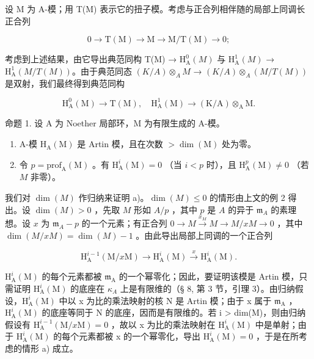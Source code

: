 设 M 为 A-模；用 T(M) 表示它的扭子模。考虑与正合列相伴随的局部上同调长正合列

\[
0 \to \mathrm{T} (\mathrm{M}) \to \mathrm{M} \to \mathrm{M} / \mathrm{T} (\mathrm{M}) \to 0;
\]

考虑到上述结果，由它导出典范同构 T(M) → \(\mathrm{H}_{\mathrm{A}}^{0}(M)\) 与 \(\mathrm{H}_{\mathrm{A}}^{1}(M)\) → \(\mathrm{H}_{\mathrm{A}}^{1}(M/T(M))\)。由于典范同态 \((K/A) \otimes_{A} M\) → \((K/A) \otimes_{A} (M/T(M))\) 是双射，我们最终得到典范同构

\[
\mathrm{H} _ {\mathrm{A}} ^ {0} (\mathrm{M}) \rightarrow \mathrm{T} (\mathrm{M}), \quad \mathrm{H} _ {\mathrm{A}} ^ {1} (\mathrm{M}) \rightarrow (\mathrm{K} / \mathrm{A}) \otimes_ {\mathrm{A}} \mathrm{M}.
\]

命题 1. 设 A 为 Noether 局部环，M 为有限生成的 A-模。

\begin{enumerate}
\def\labelenumi{\alph{enumi})}
\item
  A-模 \(\mathrm{H}_{\mathrm{A}}(\mathrm{M})\) 是 Artin 模，且在次数 \(>\dim (\mathrm{M})\) 处为零。
\item
  令 \(p = \mathrm{prof}_{\mathrm{A}}(\mathrm{M})\) 。有 \(\mathrm{H}_{\mathrm{A}}^{i}(\mathrm{M}) = 0\) （当 \(i < p\) 时），且 \(\mathrm{H}_{\mathrm{A}}^{p}(\mathrm{M}) \neq 0\) （若 \(M\) 非零）。
\end{enumerate}

我们对 \(\dim(M)\) 作归纳来证明 a)。\(\dim(M) \leqslant 0\) 的情形由上文的例 2 得出。设 \(\dim(M) > 0\) ，先取 \(M\) 形如 \(A/p\) ，其中 \(p\) 是 \(A\) 的异于 \(\mathfrak{m}_A\) 的素理想。设 \(x\) 为 \(\mathfrak{m}_A - p\) 的一个元素；有正合列 \(0 \to M \xrightarrow{x_M} M \longrightarrow M/xM \to 0\) ，其中 \(\dim(M/xM) = \dim(M) - 1\) 。由此导出局部上同调的一个正合列

\[
\mathrm{H} _ {\mathrm{A}} ^ {i - 1} (\mathrm{M} / x \mathrm{M}) \longrightarrow \mathrm{H} _ {\mathrm{A}} ^ {i} (\mathrm{M}) \stackrel {x} {\longrightarrow} \mathrm{H} _ {\mathrm{A}} ^ {i} (\mathrm{M}).
\]

\(\mathrm{H}_{\mathrm{A}}^{i}(\mathrm{M})\) 的每个元素都被 \(\mathfrak{m}_{\mathrm{A}}\) 的一个幂零化；因此，要证明该模是 Artin 模，只需证明 \(\mathrm{H}_{\mathrm{A}}^{i}(\mathrm{M})\) 的底座在 \(\kappa_{A}\) 上是有限维的（§ 8, 第 3 节，引理 3）。由归纳假设，\(\mathrm{H}_{\mathrm{A}}^{i}(\mathrm{M})\) 中以 x 为比的乘法映射的核 N 是 Artin 模；由于 x 属于 \(\mathfrak{m}_{\mathrm{A}}\) ，\(\mathrm{H}_{\mathrm{A}}^{i}(\mathrm{M})\) 的底座等同于 N 的底座，因而是有限维的。若 i > dim(M)，则由归纳假设有 \(\mathrm{H}_{\mathrm{A}}^{i-1}(\mathrm{M}/x\mathrm{M}) = 0\) ，故以 x 为比的乘法映射在 \(\mathrm{H}_{\mathrm{A}}^{i}(\mathrm{M})\) 中是单射；由于 \(\mathrm{H}_{\mathrm{A}}^{i}(\mathrm{M})\) 的每个元素都被 x 的一个幂零化，导出 \(\mathrm{H}_{\mathrm{A}}^{i}(\mathrm{M}) = 0\) ，于是在所考虑的情形 a) 成立。

